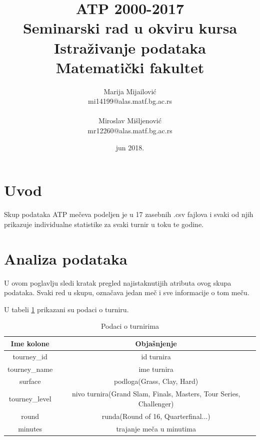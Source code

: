 \documentclass[a4paper]{article}
\begin{document}
\title{ATP 2000-2017\\ \small{Seminarski rad u okviru kursa\\Istraživanje podataka\\ Matematički fakultet\\} \vspace{1cm}}
\author{Marija Mijailović\\mi14199@alas.matf.bg.ac.rs\\ \\Miroslav Mišljenović\\mr12260@alas.matf.bg.ac.rs}
\date{jun 2018.}
\maketitle


\tableofcontents

\newpage

\section{Uvod}
\label{sec:uvod}

Skup podataka ATP mečeva podeljen je u 17 zasebnih .csv fajlova i svaki od njih prikazuje individualne statistike za svaki turnir u toku te godine.

\section{Analiza podataka}

U ovom poglavlju sledi kratak pregled najistaknutijih atributa ovog skupa podataka.
Svaki red u skupu, označava jedan meč i sve informacije o tom meču.

U tabeli \ref{table:turnir} prikazani su podaci o turniru.


\begin{table}[H]
	\begin{center}
		\begin{tabular}{ | c | c | } 
			\hline
			Ime kolone & Objašnjenje \\ 
			\hline
			tourney\_id & id turnira \\
			tourney\_name & ime turnira \\
			surface & podloga(Grass, Clay, Hard) \\
			tourney\_level & nivo turnira(Grand Slam, Finals, Masters, Tour Series, Challenger) \\ 
			round & runda(Round of 16, Quarterfinal...) \\
			minutes & trajanje meča u minutima \\
			\hline
		\end{tabular}
	\end{center}
	\caption{Podaci o turnirima}
	\label{table:turnir}
\end{table}
\end{document}
